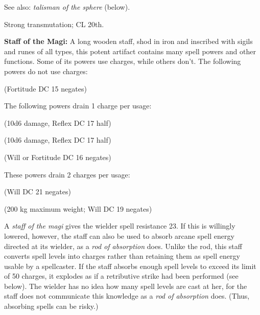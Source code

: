 See also: \emph{talisman of the sphere} (below).

Strong transmutation; CL 20th.

\textbf{Staff of the Magi:} A long wooden staff, shod in iron and inscribed with sigils and runes of all types, this potent artifact contains many spell powers and other functions. Some of its powers use charges, while others don't. The following powers do not use charges:
\begin{itemize*}
\item {}
\item {} (Fortitude DC 15 negates)
\item {}
\item {}
\item {}
\item {}
\end{itemize*}

The following powers drain 1 charge per usage:
\begin{itemize*}
\item {}
\item {} (10d6 damage, Reflex DC 17 half)
\item {}
\item {}
\item {}
\item {} (10d6 damage, Reflex DC 17 half)
\item {}
\item {} (Will or Fortitude DC 16 negates)
\item {}
\item {}
\end{itemize*}

These powers drain 2 charges per usage:
\begin{itemize*}
\item {}
\item {} (Will DC 21 negates)
\item {} (200 kg maximum weight; Will DC 19 negates)
\end{itemize*}

A \emph{staff of the magi} gives the wielder spell resistance 23. If this is willingly lowered, however, the staff can also be used to absorb arcane spell energy directed at its wielder, as a \emph{rod of absorption} does. Unlike the rod, this staff converts spell levels into charges rather than retaining them as spell energy usable by a spellcaster. If the staff absorbs enough spell levels to exceed its limit of 50 charges, it explodes as if a retributive strike had been performed (see below). The wielder has no idea how many spell levels are cast at her, for the staff does not communicate this knowledge as a \emph{rod of absorption} does. (Thus, absorbing spells can be risky.)

